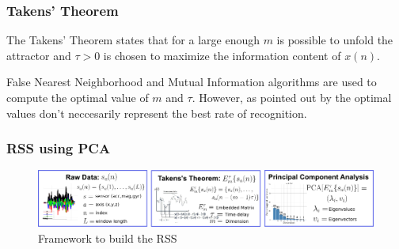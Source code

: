 \documentclass{beamer}
\begin{document}
\begin{frame}
\frametitle{Takens' Theorem}

The Takens' Theorem states that for a large enough $m$ is possible to unfold the attractor
and $\tau > 0$ is chosen to maximize the information content of $x(n)$.

\vspace{5mm}

False Nearest Neighborhood and Mutual Information algorithms are used to compute
the optimal value of $m$ and $\tau$. However, as pointed out by  \textcolor{red}{\textbf{ \cite{Sama2013} }}
the optimal values don't neccesarily represent the best rate of recognition.



\end{frame}



\begin{frame}
\frametitle{RSS using PCA}
\vspace{-0.7cm}



\begin{figure}[!htb]
\centering
\includegraphics[width=1\textwidth]{method_diagram03}
\caption[PA]{Framework to build the RSS}
 \label{fig:sn}
\end{figure}


\end{frame}
\end{document}
